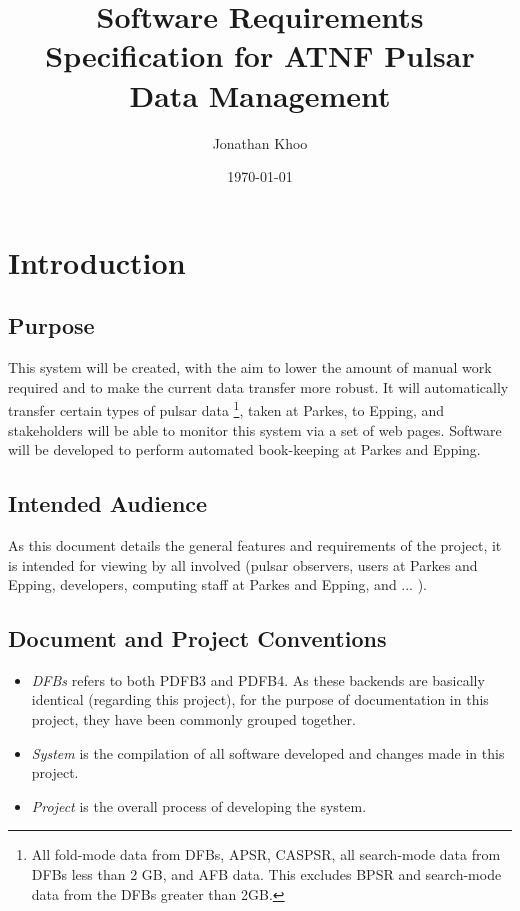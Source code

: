 \documentclass[a4paper,11pt]{article}
\begin{document}
\title{Software Requirements Specification for ATNF Pulsar Data Management}
\author{Jonathan Khoo}
\date{\today}
\maketitle
\clearpage

\section{Introduction}


\subsection{Purpose}
This system will be created, with the aim to lower the amount of manual work required and to make the current data transfer more robust. It will automatically transfer certain types of pulsar data \footnote{All fold-mode data from DFBs, APSR, CASPSR, all search-mode data from DFBs less than 2 GB, and AFB data. This excludes BPSR and search-mode data from the DFBs greater than 2GB.}, taken at Parkes, to Epping, and stakeholders will be able to monitor this system via a set of web pages. Software will be developed to perform automated book-keeping at Parkes and Epping.

\subsection{Intended Audience}
As this document details the general features and requirements of the project, it is intended for viewing by all involved (pulsar observers, users at Parkes and Epping, developers, computing staff at Parkes and Epping, and ... ).

\subsection{Document and Project Conventions}
\begin{itemize}
\item \emph{DFBs} refers to both PDFB3 and PDFB4. As these backends are basically identical (regarding this project), for the purpose of documentation in this project, they have been commonly grouped together.
\item \emph{System} is the compilation of all software developed and changes made in this project.
\item \emph{Project} is the overall process of developing the system.
\end{itemize}
\end{document}
